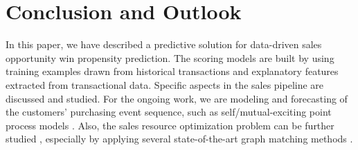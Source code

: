 \documentclass[10pt,conference]{IEEEtran}
\begin{document}
\section{Conclusion and Outlook}
In this paper, we have described a predictive solution for data-driven sales opportunity win propensity prediction. The scoring models are built by using training examples drawn from historical transactions and explanatory features extracted from transactional data. Specific aspects in the sales pipeline are discussed and studied. For the ongoing work, we are modeling and forecasting of the customers' purchasing event sequence, such as self/mutual-exciting point process models \cite{YanIJCAI13,YanAAAI15}. Also, the sales resource optimization problem can be further studied \cite{WangEJOR13}, especially by applying several state-of-the-art graph matching methods \cite{TianECCV12,YanICCV13,YanECCV14,YanAAAI15P,YanTIP15}.
\end{document}
